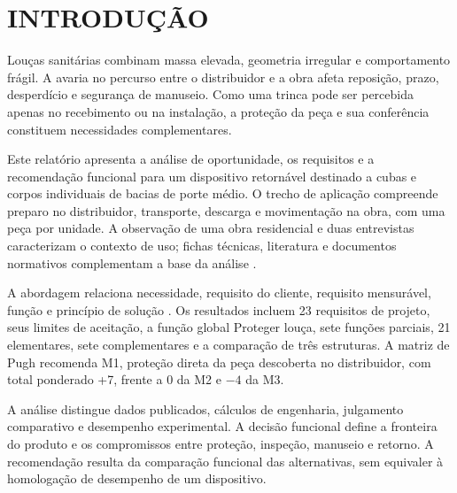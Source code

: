 \section{INTRODUÇÃO}

Louças sanitárias combinam massa elevada, geometria irregular e comportamento frágil. A avaria no percurso entre o distribuidor e a obra afeta reposição, prazo, desperdício e segurança de manuseio. Como uma trinca pode ser percebida apenas no recebimento ou na instalação, a proteção da peça e sua conferência constituem necessidades complementares.

Este relatório apresenta a análise de oportunidade, os requisitos e a recomendação funcional para um dispositivo retornável destinado a cubas e corpos individuais de bacias de porte médio. O trecho de aplicação compreende preparo no distribuidor, transporte, descarga e movimentação na obra, com uma peça por unidade. A observação de uma obra residencial e duas entrevistas caracterizam o contexto de uso; fichas técnicas, literatura e documentos normativos complementam a base da análise \citep{equipe2026,celited5,decalk}.

A abordagem relaciona necessidade, requisito do cliente, requisito mensurável, função e princípio de solução \citep{rozenfeld2006,back2008}. Os resultados incluem 23 requisitos de projeto, seus limites de aceitação, a função global Proteger louça, sete funções parciais, 21 elementares, sete complementares e a comparação de três estruturas. A matriz de Pugh recomenda M1, proteção direta da peça descoberta no distribuidor, com total ponderado +7, frente a 0 da M2 e $-4$ da M3.

A análise distingue dados publicados, cálculos de engenharia, julgamento comparativo e desempenho experimental. A decisão funcional define a fronteira do produto e os compromissos entre proteção, inspeção, manuseio e retorno. A recomendação resulta da comparação funcional das alternativas, sem equivaler à homologação de desempenho de um dispositivo.
